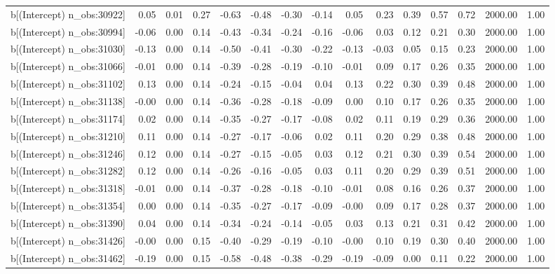 \begin{table}[ht]
\begin{tabular}{rrrrrrrrrrrrrrr}
  b[(Intercept) n\_obs:30922] & 0.05 & 0.01 & 0.27 & -0.63 & -0.48 & -0.30 & -0.14 & 0.05 & 0.23 & 0.39 & 0.57 & 0.72 & 2000.00 & 1.00 \\ 
  b[(Intercept) n\_obs:30994] & -0.06 & 0.00 & 0.14 & -0.43 & -0.34 & -0.24 & -0.16 & -0.06 & 0.03 & 0.12 & 0.21 & 0.30 & 2000.00 & 1.00 \\ 
  b[(Intercept) n\_obs:31030] & -0.13 & 0.00 & 0.14 & -0.50 & -0.41 & -0.30 & -0.22 & -0.13 & -0.03 & 0.05 & 0.15 & 0.23 & 2000.00 & 1.00 \\ 
  b[(Intercept) n\_obs:31066] & -0.01 & 0.00 & 0.14 & -0.39 & -0.28 & -0.19 & -0.10 & -0.01 & 0.09 & 0.17 & 0.26 & 0.35 & 2000.00 & 1.00 \\ 
  b[(Intercept) n\_obs:31102] & 0.13 & 0.00 & 0.14 & -0.24 & -0.15 & -0.04 & 0.04 & 0.13 & 0.22 & 0.30 & 0.39 & 0.48 & 2000.00 & 1.00 \\ 
  b[(Intercept) n\_obs:31138] & -0.00 & 0.00 & 0.14 & -0.36 & -0.28 & -0.18 & -0.09 & 0.00 & 0.10 & 0.17 & 0.26 & 0.35 & 2000.00 & 1.00 \\ 
  b[(Intercept) n\_obs:31174] & 0.02 & 0.00 & 0.14 & -0.35 & -0.27 & -0.17 & -0.08 & 0.02 & 0.11 & 0.19 & 0.29 & 0.36 & 2000.00 & 1.00 \\ 
  b[(Intercept) n\_obs:31210] & 0.11 & 0.00 & 0.14 & -0.27 & -0.17 & -0.06 & 0.02 & 0.11 & 0.20 & 0.29 & 0.38 & 0.48 & 2000.00 & 1.00 \\ 
  b[(Intercept) n\_obs:31246] & 0.12 & 0.00 & 0.14 & -0.27 & -0.15 & -0.05 & 0.03 & 0.12 & 0.21 & 0.30 & 0.39 & 0.54 & 2000.00 & 1.00 \\ 
  b[(Intercept) n\_obs:31282] & 0.12 & 0.00 & 0.14 & -0.26 & -0.16 & -0.05 & 0.03 & 0.11 & 0.20 & 0.29 & 0.39 & 0.51 & 2000.00 & 1.00 \\ 
  b[(Intercept) n\_obs:31318] & -0.01 & 0.00 & 0.14 & -0.37 & -0.28 & -0.18 & -0.10 & -0.01 & 0.08 & 0.16 & 0.26 & 0.37 & 2000.00 & 1.00 \\ 
  b[(Intercept) n\_obs:31354] & 0.00 & 0.00 & 0.14 & -0.35 & -0.27 & -0.17 & -0.09 & -0.00 & 0.09 & 0.17 & 0.28 & 0.37 & 2000.00 & 1.00 \\ 
  b[(Intercept) n\_obs:31390] & 0.04 & 0.00 & 0.14 & -0.34 & -0.24 & -0.14 & -0.05 & 0.03 & 0.13 & 0.21 & 0.31 & 0.42 & 2000.00 & 1.00 \\ 
  b[(Intercept) n\_obs:31426] & -0.00 & 0.00 & 0.15 & -0.40 & -0.29 & -0.19 & -0.10 & -0.00 & 0.10 & 0.19 & 0.30 & 0.40 & 2000.00 & 1.00 \\ 
  b[(Intercept) n\_obs:31462] & -0.19 & 0.00 & 0.15 & -0.58 & -0.48 & -0.38 & -0.29 & -0.19 & -0.09 & 0.00 & 0.11 & 0.22 & 2000.00 & 1.00 \\ 

\end{tabular}
\end{table}
